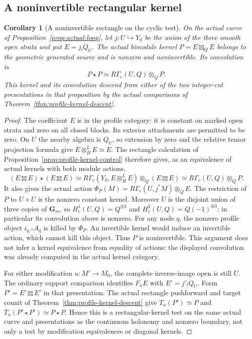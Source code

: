 \documentclass[11pt]{article}
\newtheorem{corollary}[theorem]{Corollary}
\theoremstyle{definition}
\theoremstyle{remark}
\begin{document}
\subsection{A noninvertible rectangular kernel}
\begin{corollary}[A noninvertible rectangle on the cyclic test]
\label{cor:actual-loop-rectangle}
On the actual curve of Proposition~\ref{prop:actual-loop}, let
$j:U\hookrightarrow Y_0$ be the union of the three smooth open
strata and put $E=j_!Q_U$.  The actual bimodule kernel
$P=E\boxtimes_Q E$ belongs to the geometric generated source and
is nonzero and noninvertible.  Its convolution is
\[
 P\star P\simeq R\Gamma_c(U,Q)\otimes_Q P.
\]
This kernel and its convolution descend from either of the two
integer-cut presentations in that proposition by the actual
comparisons of Theorem~\ref{thm:profile-kernel-descent}.
\end{corollary}
\begin{proof}
The coefficient $E$ is in the profile category: it is constant on
marked open strata and zero on all closed blocks.  Its exterior
attachments are permitted to be zero.  On $U$ the nearby algebra
is $Q_U$, so extension by zero and the relative tensor projection
formula give $E\otimes_H^L E\simeq E$.  The rectangle calculation
of Proposition~\ref{prop:profile-kernel-control} therefore gives,
as an equivalence of actual kernels with both module actions,
\[
 (E\boxtimes E)\star(E\boxtimes E)
 \simeq R\Gamma_c(Y_0,E\otimes_H^L E)\otimes_Q(E\boxtimes E)
 \simeq R\Gamma_c(U,Q)\otimes_Q P.
\]
It also gives the actual action
$\Phi_P(M)=R\Gamma_c(U,j^*M)\otimes_Q E$.
The restriction of $P$ to $U\times U$ is the nonzero constant
kernel.  Moreover $U$ is the disjoint union of three copies of
$\mathbf G_m$, so $H_c^1(U,Q)=Q^{\oplus3}$ and
$H_c^2(U,Q)=Q(-1)^{\oplus3}$; in particular its convolution above
is nonzero.  For any node $q$, the nonzero profile object
$i_{q,*}A_q$ is killed by $\Phi_P$.  An invertible kernel would
induce an invertible action, which cannot kill this object.
Thus $P$ is noninvertible.  This argument does not infer a kernel
equivalence from equality of actions: the displayed convolution
was already computed in the actual kernel category.

For either modification $u:M'\to M_0$, the complete inverse-image
open is still $U$.  The ordinary support comparison identifies
$F_uE$ with $E'=j'_!Q_U$.  Form $P'=E'\boxtimes E'$ in that
presentation.  The actual rectangle pushforward and target counit
of Theorem~\ref{thm:profile-kernel-descent} give
$T_u(P')\simeq P$ and
$T_u(P'\star P')\simeq P\star P$.
Hence this is a rectangular-kernel test on the same actual curve
and presentations as the continuous holonomy and nonzero boundary,
not only a test by modification equivalences or diagonal kernels.
\end{proof}
\end{document}
